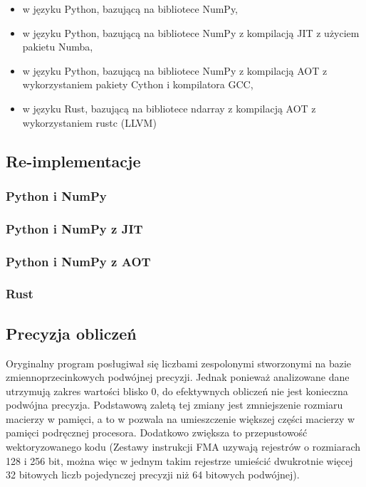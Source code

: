 \documentclass[12pt, a4paper]{article}
\begin{document}
\begin{sloppypar}
    \begin{itemize}
      \item w języku Python, bazującą na bibliotece NumPy,

      \item w języku Python, bazującą na bibliotece NumPy z kompilacją JIT z użyciem
        pakietu Numba,

      \item w języku Python, bazującą na bibliotece NumPy z kompilacją AOT z
        wykorzystaniem pakiety Cython i kompilatora GCC,

      \item w języku Rust, bazującą na bibliotece ndarray z kompilacją AOT z
        wykorzystaniem rustc (LLVM)
    \end{itemize}

    \subsection{Re-implementacje}


    \subsubsection{ Python i NumPy }


    \subsubsection{ Python i NumPy z JIT }


    \subsubsection{ Python i NumPy z AOT }


    \subsubsection{ Rust }


    \subsection{Precyzja obliczeń}


    Oryginalny program posługiwał się liczbami zespolonymi stworzonymi na bazie
    zmiennoprzecinkowych podwójnej precyzji. Jednak ponieważ analizowane dane utrzymują zakres
    wartości blisko 0, do efektywnych obliczeń nie jest konieczna podwójna precyzja. Podstawową
    zaletą tej zmiany jest zmniejszenie rozmiaru macierzy w pamięci, a to w pozwala na
    umieszczenie większej części macierzy w pamięci podręcznej procesora. Dodatkowo zwiększa
    to przepustowość wektoryzowanego kodu (Zestawy instrukcji FMA uzywają rejestrów o
    rozmiarach 128 i 256 bit, można więc w jednym takim rejestrze umieścić dwukrotnie więcej
    32 bitowych liczb pojedynczej precyzji niż 64 bitowych podwójnej).


\end{sloppypar}
\end{document}
